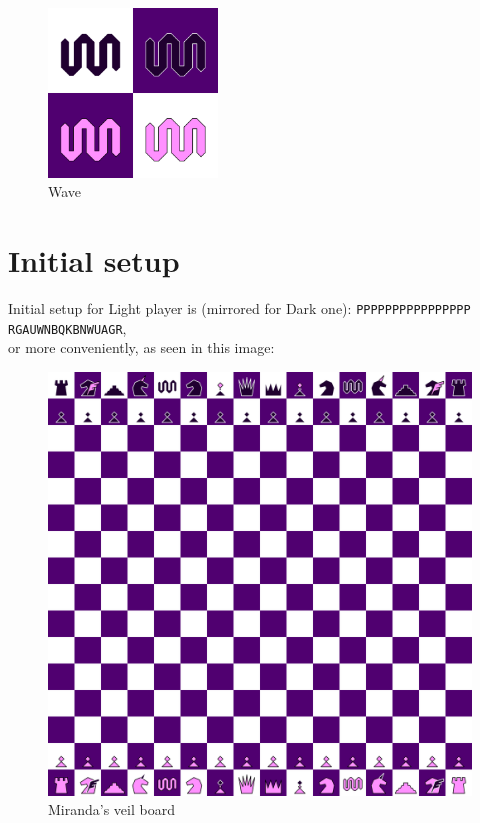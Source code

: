 \documentclass[a5paper,12pt,draft]{book} %
\begin{document}
\noindent
\begin{figure}
\includegraphics[width=0.4\textwidth, keepaspectratio=true]{../gfx/pieces/10_wave.png}
\caption{Wave}
\label{fig:wave}
\end{figure}

\clearpage

\section*{Initial setup}

Initial setup for Light player is (mirrored for Dark one):
\texttt{PPPPPPPPPPPPPPPP \\
        RGAUWNBQKBNWUAGR}, \\
or more conveniently, as seen in this image:

\noindent
\begin{figure}[h]
\includegraphics[width=1.0\textwidth, keepaspectratio=true]{../gfx/boards/10_miranda_s_veil.png}
\caption{Miranda's veil board}
\label{fig:miranda_s_veil}
\end{figure}
\end{document}

